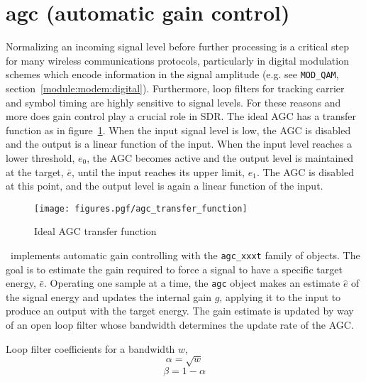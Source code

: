 % 
%

\section{agc (automatic gain control)}
\label{module:agc}
Normalizing an incoming signal level before further processing is a critical
step for many wireless communications protocols, particularly in digital
modulation schemes which encode information in the signal amplitude (e.g. see
{\tt MOD\_QAM}, section~\ref{module:modem:digital}).
Furthermore, loop filters for tracking carrier and symbol timing are highly
sensitive to signal levels.
For these reasons and more does gain control play a crucial role in SDR.
The ideal AGC has a transfer function as in
figure~\ref{fig:module:agc:transfer_function}.
When the input signal level is low, the AGC is disabled and the output is a
linear function of the input.
When the input level reaches a lower threshold, $e_0$, the AGC becomes active
and the output level is maintained at the target, $\bar{e}$, until the input
reaches its upper limit, $e_1$.
The AGC is disabled at this point, and the output level is again a linear
function of the input.

\begin{figure}[h!]
\centering
  \texttt{[image: figures.pgf/agc\_transfer\_function]}
\caption{Ideal AGC transfer function}
\label{fig:module:agc:transfer_function}
\end{figure}


\liquid\ implements automatic gain controlling with the {\tt agc\_xxxt}
family of objects.
The goal is to estimate the gain required to force a signal to have a specific
target energy, $\bar{e}$.
Operating one sample at a time, the {\tt agc} object makes an estimate
$\hat{e}$ of the signal energy and updates the internal gain $\hat{g}$,
applying it to the input to produce an output with the target energy.
The gain estimate is updated by way of an open loop filter whose bandwidth
determines the update rate of the AGC.

Loop filter coefficients for a bandwidth $w$,
\[  \alpha = \sqrt{w}   \]
\[  \beta = 1 - \alpha  \]

